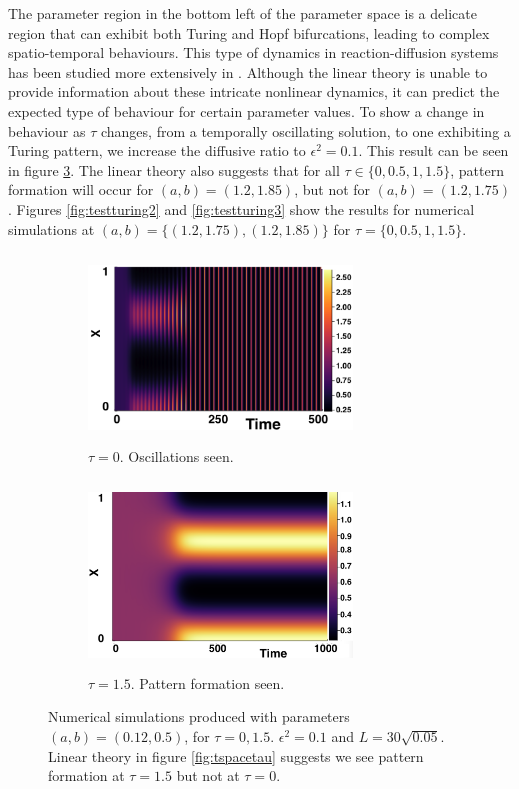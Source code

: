 The parameter region in the bottom left of the parameter space is a delicate region that can exhibit both Turing and Hopf bifurcations, leading to complex spatio-temporal behaviours. This type of dynamics in reaction-diffusion systems has been studied more extensively in \cite{krausefixed,jiang}. Although the linear theory is unable to provide information about these intricate nonlinear dynamics, it can predict the expected type of behaviour for certain parameter values. To show a change in behaviour as $\tau$ changes, from a temporally oscillating solution, to one exhibiting a Turing pattern, we increase the diffusive ratio to $\epsilon^2=0.1$. This result can be seen in figure \ref{fig:testturing}. The linear theory also suggests that for all $\tau\in\{0,0.5,1,1.5\}$, pattern formation will occur for $(a,b)=(1.2,1.85)$, but not for $(a,b)=(1.2,1.75)$. Figures \ref{fig:testturing2} and \ref{fig:testturing3} show the results for numerical simulations at $(a,b)=\{(1.2,1.75),(1.2,1.85)\}$ for $\tau=\{0,0.5,1,1.5\}$.
\begin{figure}[h]
    \centering
    \begin{subfigure}[b]{0.45\textwidth}
        \centering
        \includegraphics[width=7cm,height=5cm]{toscill.png}
        \caption{$\tau=0$. Oscillations seen.}
        \label{}
    \end{subfigure}
    \hfill
    \begin{subfigure}[b]{0.45\textwidth}
        \centering
        \includegraphics[width=7cm,height=5cm]{tpattpred.png}
        \caption{$\tau=1.5$. Pattern formation seen.}
        \label{}
    \end{subfigure}
    \caption{Numerical simulations produced with parameters $(a,b)=(0.12,0.5)$, for $\tau=0,1.5$. $\epsilon^2=0.1$ and $L=30\sqrt{0.05}$. Linear theory in figure \ref{fig:tspacetau} suggests we see pattern formation at $\tau=1.5$ but not at $\tau=0$.}
    \label{fig:testturing}
\end{figure}


